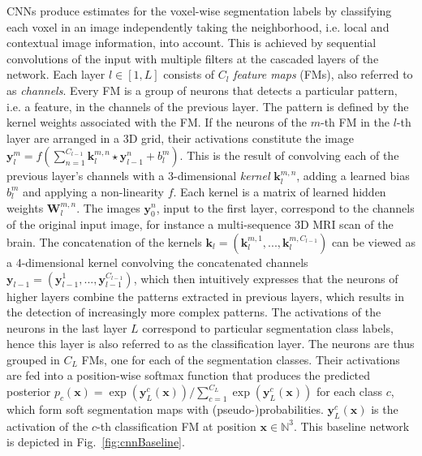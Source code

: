 CNNs produce estimates for the voxel-wise segmentation labels by classifying each voxel in an image independently taking the neighborhood, i.e. local and contextual image information, into account. This is achieved by sequential convolutions of the input with multiple filters at the cascaded layers of the network. Each layer $l\in [1,L]$ consists of $C_l$ \textit{feature maps} (FMs), also referred to as \textit{channels}. Every FM is a group of neurons that detects a particular pattern, i.e. a feature, in the channels of the previous layer. The pattern is defined by the kernel weights associated with the FM. If the neurons of the $m$-th FM in the $l$-th layer are arranged in a 3D grid, their activations constitute the image $\mathbf{y}^{m}_{l} = f( \sum_{n=1}^{C_{l-1}}{\mathbf{k}^{m,n}_{l} \star \mathbf{y}^{n}_{l-1}} + b^{m}_{l})$. This is the result of convolving each of the previous layer's channels with a 3-dimensional \textit{kernel} $\mathbf{k}^{m,n}_{l}$, adding a learned bias $b^{m}_{l}$ and applying a non-linearity $f$. Each kernel is a matrix of learned hidden weights $\mathbf{W}^{m,n}_{l}$. The images $\mathbf{y}^n_0$, input to the first layer, correspond to the channels of the original input image, for instance a multi-sequence 3D MRI scan of the brain. The concatenation of the kernels $\mathbf{k}_l=(\mathbf{k}^{m,1}_{l},...,\mathbf{k}^{m,C_{l-1}}_{l})$ can be viewed as a 4-dimensional kernel convolving the concatenated channels $\mathbf{y}_{l-1}=(\mathbf{y}^{1}_{l-1}, ..., \mathbf{y}^{C_{l-1}}_{l-1})$, which then intuitively expresses that the neurons of higher layers combine the patterns extracted in previous layers, which results in the detection of increasingly more complex patterns. The activations of the neurons in the last layer $L$ correspond to particular segmentation class labels, hence this layer is also referred to as the classification layer. The neurons are thus grouped in $C_L$ FMs, one for each of the segmentation classes. Their activations are fed into a position-wise softmax function that produces the predicted posterior $p_c(\mathbf{x}) = \exp(\mathbf{y}_L^{c}(\mathbf{x}))/ \sum_{c=1}^{C_L} \exp(\mathbf{y}_L^{c}(\mathbf{x}))$ for each class $c$, which form soft segmentation maps with (pseudo-)probabilities. $\mathbf{y}_L^{c}(\mathbf{x})$ is the activation of the $c$-th classification FM at position $\mathbf{x} \in \mathbb{N}^3$. This baseline network is depicted in Fig.~\ref{fig:cnnBaseline}.


